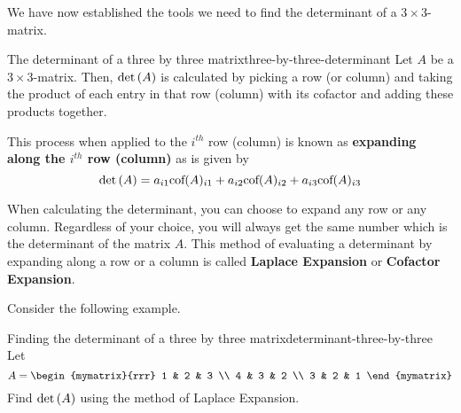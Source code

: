 We have now established the tools we need to find the determinant of a $3 \times3 $-matrix.

\begin{definition}{The determinant of a three by three matrix}{three-by-three-determinant}
Let $A$ be a $3\times 3$-matrix. Then, $\det \left(A\right)$ is calculated by picking a row
(or column) and taking the product of each entry in that row (column) with its
cofactor and adding these products together. 

This process when applied to the $i^{th}$
row (column) is known as \textbf{expanding along the $i^{th}$ row
(column)} as is given by 
\[
\det \left(A\right) = a_{i1}\mbox{\rm cof}(A)_{i1} + a_{i2}\mbox{\rm cof}(A)_{i2} + a_{i3}\mbox{\rm cof}(A)_{i3}
\]

\end{definition}

When calculating the determinant, you can choose to expand any row or any column. Regardless 
of your choice, you will always get the same number which is the determinant of the matrix $A$. 
This method of evaluating a determinant by expanding along a row or a column is called \textbf{Laplace
Expansion} or \textbf{Cofactor Expansion}.


Consider the following example. 

\begin{example}{Finding the determinant of a three by three matrix}{determinant-three-by-three}
Let 
\begin{equation*}
A=\begin{mymatrix}{rrr}
1 & 2 & 3 \\
4 & 3 & 2 \\
3 & 2 & 1
\end{mymatrix} 
\end{equation*}
Find $\det\left(A\right)$ using the method of Laplace Expansion.
\end{example}

